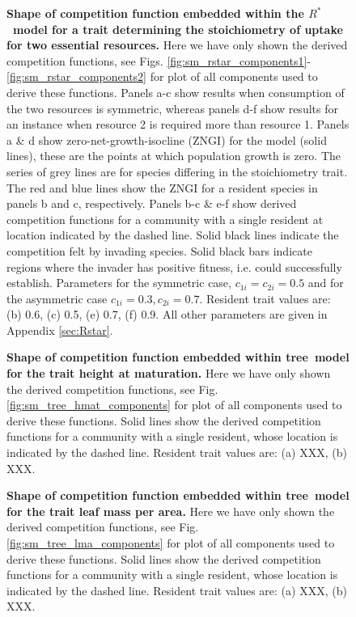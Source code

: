 \documentclass[a4paper,11pt]{article}
\newcommand{\Rstar}{\ensuremath{R^*}}
\newcommand{\TREE}{{\sc tree}}
\begin{document}
\begin{figure}[h]
  \centering
  \caption{\textbf{Shape of competition function embedded within the \Rstar\ model
  for a trait determining the stoichiometry of uptake for two essential resources.}
  Here we have only shown the derived  competition functions, see Figs.
  \ref{fig:sm_rstar_components1}-\ref{fig:sm_rstar_components2} for plot of all
  components used to derive these functions.
  Panels a-c show results when consumption of the two resources is symmetric, whereas
  panels d-f show results for an instance when resource 2 is required more than
  resource 1. Panels a \& d show zero-net-growth-isocline (ZNGI) for
  the  model  (solid lines), these are the points at which population growth is zero.
  The series of grey lines are for species differing in the stoichiometry trait.
  The red and blue lines show the ZNGI for a resident species in panels b and
  c, respectively. Panels b-c \& e-f show derived competition functions for a
  community with a single resident at location indicated by the dashed line.
  Solid black lines indicate the competition felt by invading species. Solid
  black bars indicate regions where the invader has positive fitness, i.e.
  could successfully establish. Parameters for the symmetric case, $c_{1i} =
  c_ {2i}=0.5$ and for the asymmetric case $c_{1i} = 0.3, c_ {2i}=0.7$. Resident
  trait values are: (b) 0.6, (c) 0.5, (e) 0.7, (f) 0.9. All other parameters
  are given in Appendix \ref{sec:Rstar}.
  \label{fig:Rstar}}
\end{figure}

\begin{figure}[h]
  \centering
  \caption{\textbf{Shape of competition function embedded within \TREE\ model for
  the trait height at maturation.}
  Here we have only shown the derived  competition functions, see Fig.
  \ref{fig:sm_tree_hmat_components} for plot of all components used to derive these functions.
  Solid lines show the derived competition functions for a community with a
  single resident, whose location is indicated by the dashed line.
  Resident trait values are: (a) XXX, (b) XXX.
  \label{fig:tree_hmat}}
\end{figure}

\begin{figure}[h]
  \centering
  \caption{\textbf{Shape of competition function embedded within \TREE\ model for
  the trait leaf mass per area.}
  Here we have only shown the derived  competition functions, see Fig.
  \ref{fig:sm_tree_lma_components} for plot of all components used to derive these functions.
  Solid lines show the derived competition functions for a community with a
  single resident, whose location is indicated by the dashed line.
  Resident trait values are: (a) XXX, (b) XXX.
  \label{fig:tree_lma}}
\end{figure}
\end{document}

